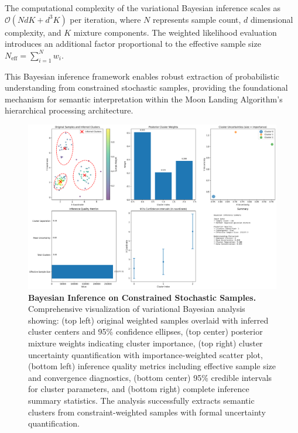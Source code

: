 The computational complexity of the variational Bayesian inference scales as $\mathcal{O}(NdK + d^3K)$ per iteration, where $N$ represents sample count, $d$ dimensional complexity, and $K$ mixture components. The weighted likelihood evaluation introduces an additional factor proportional to the effective sample size $N_{\text{eff}} = \sum_{i=1}^N w_i$.

This Bayesian inference framework enables robust extraction of probabilistic understanding from constrained stochastic samples, providing the foundational mechanism for semantic interpretation within the Moon Landing Algorithm's hierarchical processing architecture.

\begin{figure}[htbp]
\centering
\includegraphics[width=\textwidth]{images/bayesian_inference_demo.png}
\caption{\textbf{Bayesian Inference on Constrained Stochastic Samples.} Comprehensive visualization of variational Bayesian analysis showing: (top left) original weighted samples overlaid with inferred cluster centers and 95\% confidence ellipses, (top center) posterior mixture weights indicating cluster importance, (top right) cluster uncertainty quantification with importance-weighted scatter plot, (bottom left) inference quality metrics including effective sample size and convergence diagnostics, (bottom center) 95\% credible intervals for cluster parameters, and (bottom right) complete inference summary statistics. The analysis successfully extracts semantic clusters from constraint-weighted samples with formal uncertainty quantification.}
\label{fig:bayesian-inference}
\end{figure}
